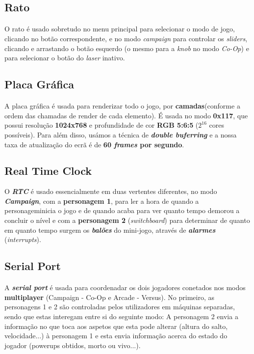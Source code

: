 \documentclass{report}
\begin{document}
\subsection{Rato}

\paragraph{}
O rato é usado sobretudo no menu principal para selecionar o modo de jogo, clicando no botão correspondente, e no modo \textit{campaign} para controlar os \textit{sliders}, clicando e arrastando o botão esquerdo (o mesmo para a \textit{knob} no modo \textit{Co-Op}) e para selecionar o botão do \textit{laser} inativo.  

\subsection{Placa Gráfica}

\paragraph{}
A placa gráfica é usada para renderizar todo o jogo, por \textbf{camadas}(conforme a ordem das chamadas de render de cada elemento). É usada no modo \textbf{0x117}, que possui resolução \textbf{1024x768} e profundidade de cor \textbf{RGB 5:6:5} ($2^{16}$ cores possíveis).
Para além disso, usámos a técnica de \textbf{\textit{double buferring}} e a nossa taxa de atualização do ecrã é de \textbf{60 \textit{frames} por segundo}.

\subsection{Real Time Clock}

O \textbf{\textit{RTC}} é usado essencialmente em duas vertentes diferentes, no modo \textbf{\textit{Campaign}}, com a \textbf{personagem 1}, para ler a hora de quando a personageminicia o jogo e de quando acaba para ver quanto tempo demorou a concluir o nível e com a \textbf{personagem 2} (\textit{switchboard}) para determinar de quanto em quanto tempo surgem os \textbf{\textit{balões}} do mini-jogo, através de \textbf{\textit{alarmes}} (\textit{interrupts}).

\subsection{Serial Port}

\paragraph{}
A \textbf{\textit{serial port}} é usada para coordenadar os dois jogadores conetados nos modos \textbf{multiplayer} (Campaign - Co-Op e Arcade - Versus). No primeiro, as personagens 1 e 2 são controladas pelos utilizadores em máquinas separadas, sendo que estas interegam entre si do seguinte modo: A personagem 2 envia a informação no que toca aos aspetos que esta pode alterar (altura do salto, velocidade...) à personagem 1 e esta envia informação acerca do estado do jogador (powerups obtidos, morto ou vivo...).
\end{document}
